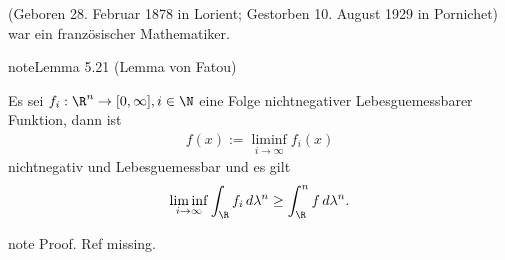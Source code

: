 \documentclass[letterpaper,10pt,german]{jupyterBook}
\begin{document}
\begin{sphinxShadowBox}

\sphinxAtStartPar
{} (Geboren 28. Februar 1878 in Lorient; Gestorben 10. August 1929 in Pornichet) war ein französischer Mathematiker.
\end{sphinxShadowBox}
\label{masstheorie/lebesgue_integral:lemma-15}
\begin{sphinxadmonition}{note}{Lemma 5.21 (Lemma von Fatou)}



\sphinxAtStartPar
Es sei \(f_i:\R^n\to[0,\infty],i\in\N\) eine Folge nicht\sphinxhyphen{}negativer Lebesgue\sphinxhyphen{}messbarer Funktion, dann ist
\begin{equation*}
\begin{split}f(x) := \liminf_{i\to\infty} f_i(x)\end{split}
\end{equation*}
\sphinxAtStartPar
nicht\sphinxhyphen{}negativ und Lebesgue\sphinxhyphen{}messbar und es gilt
\begin{equation*}
\begin{split}\liminf_{i\to\infty} \int_{\R} f_i\, d\lambda^n \geq \int_\R^n f\, d\lambda^n.\end{split}
\end{equation*}\end{sphinxadmonition}

\begin{sphinxadmonition}{note}
\sphinxAtStartPar
Proof. Ref missing.
\end{sphinxadmonition}
\end{document}
